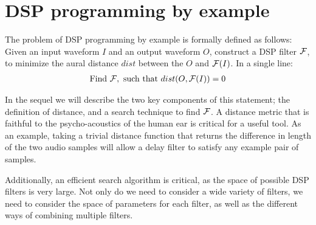 \section{DSP programming by example}

The problem of DSP programming by example is formally defined as follows:
Given an input waveform $I$ and an output waveform $O$, construct a DSP filter $\mathcal{F}$, to minimize the aural distance $dist$ between the $O$ and $\mathcal{F}(I)$.
In a single line:
%
\begin{align*}
\text{Find } \mathcal{F}, \text{ such that } dist(O,\mathcal{F}(I))=0
\end{align*}


In the sequel we will describe the two key components of this statement; the definition of distance, and a search technique to find $\mathcal{F}$.
A distance metric that is faithful to the psycho-acoustics of the human ear is critical for a useful tool.
As an example, taking a trivial distance function that returns the difference in length of the two audio samples will allow a delay filter to satisfy any example pair of samples.

Additionally, an efficient search algorithm is critical, as the space of possible DSP filters is very large.
Not only do we need to consider a wide variety of filters, we need to consider the space of parameters for each filter, as well as the different ways of combining multiple filters.
